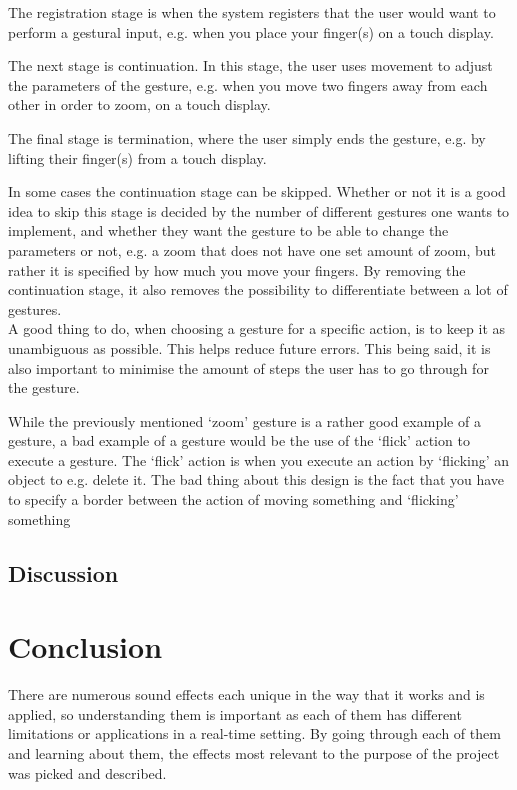 The registration stage is when the system registers that the user would want to perform a gestural input, e.g. when you place your finger(s) on a touch display. 

The next stage is continuation. In this stage, the user uses movement to adjust the parameters of the gesture, e.g. when you move two fingers away from each other in order to zoom, on a touch display.

The final stage is termination, where the user simply ends the gesture, e.g. by lifting their finger(s) from a touch display.

In some cases the continuation stage can be skipped. Whether or not it is a good idea to skip this stage is decided by the number of different gestures one wants to implement, and whether they want the gesture to be able to change the parameters or not, e.g. a zoom that does not have one set amount of zoom, but rather it is specified by how much you move your fingers. By removing the continuation stage, it also removes the possibility to differentiate between a lot of gestures. \\

A good thing to do, when choosing a gesture for a specific action, is to keep it as unambiguous as possible. This helps reduce future errors. This being said, it is also important to minimise the amount of steps the user has to go through for the gesture.

While the previously mentioned ‘zoom’ gesture is a rather good example of a gesture, a bad example of a gesture would be the use of the ‘flick’ action to execute a gesture. The ‘flick’ action is when you execute an action by ‘flicking’ an object to e.g. delete it. The bad thing about this design is the fact that you have to specify a border between the action of moving something and ‘flicking’ something

\subsection{Discussion}




\section{Conclusion}

There are numerous sound effects each unique in the way that it works and is applied, so understanding them is important as each of them has different limitations or applications in a real-time setting.
By going through each of them and learning about them, the effects most relevant to the purpose of the project was picked and described.\\

